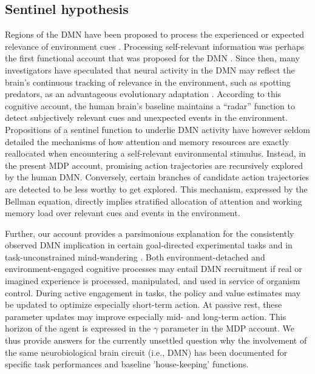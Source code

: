 \documentclass[10pt,letterpaper]{article}
\begin{document}
\subsection{Sentinel hypothesis}
Regions of the DMN have been proposed to process the
experienced or expected relevance of environment cues
\citep{montague2006imaging}.
Processing self-relevant information was perhaps the first
functional account that was proposed for the DMN
\citep{gusnard2001medial, raichle2001pnas}.
Since then,
many investigators have speculated that neural activity in the DMN
may reflect the brain's continuous tracking of
relevance in the environment, such as spotting predators,
as an advantageous evolutionary adaptation \citep{randy2008, hahn2007cingulate}.
According to this cognitive account, the human brain's baseline maintains
a ``radar'' function to
detect subjectively relevant cues and unexpected events in the environment.
Propositions of a sentinel function to underlie DMN activity
have however seldom detailed
the mechanisms of
how attention and memory resources are exactly reallocated when
encountering a self-relevant environmental stimulus.
Instead,
in the present MDP account,
promising action trajectories
are recursively explored by the human DMN. Conversely,
certain branches of candidate action trajectories
are detected to be less worthy to get explored.
This mechanism, expressed by the Bellman equation,
directly implies stratified allocation of attention and working memory load
over relevant cues and events in the environment.




Further,
our account provides a parsimonious explanation for
the consistently observed DMN implication
in certain goal-directed experimental tasks and
in task-unconstrained mind-wandering \citep{smith2009, bzdok2016formal}.
Both environment-detached and environment-engaged
cognitive processes may entail DMN recruitment
if real or imagined experience is processed, manipulated, and
used in service of organism control.
During active engagement in tasks,
the policy and value estimates may be
updated to optimize especially short-term action.
At passive rest, these parameter updates may
improve especially mid- and long-term action.
This horizon of the agent
is expressed in the $\gamma$ parameter in the MDP account.
We thus provide answers for the currently unsettled question why the involvement
of the same neurobiological brain circuit (i.e., DMN) has been documented
for specific task performances and baseline 'house-keeping' functions.
\end{document}
